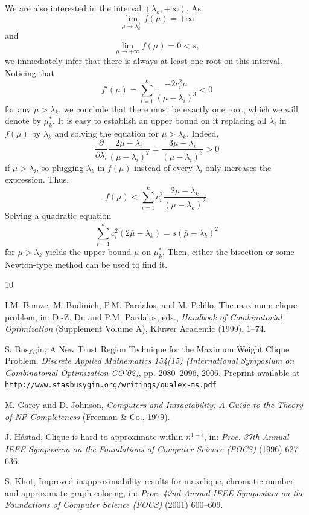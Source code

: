 \documentclass[11pt]{article}
\begin{document}
We are also interested in the interval $(\lambda_k, +\infty)$. As
\[ \lim_{\mu \to \lambda_k^+} f(\mu) = +\infty \]
and
\[ \lim_{\mu \to +\infty} f(\mu) = 0 < s, \]
we immediately infer that there is always at least one root on this interval.
Noticing that
\[ f'(\mu) = \sum_{i=1}^{k} \frac{-2 c_i^2 \mu}{(\mu - \lambda_i)^3} < 0 \]
for any $\mu>\lambda_k$, we conclude that there must be exactly one root, which
we will denote by $\mu_k^*$. It is easy to establish an upper bound on it
replacing all $\lambda_i$ in $f(\mu)$ by $\lambda_k$ and solving the equation
for $\mu>\lambda_k$. Indeed,
\[ \frac{\partial}{\partial \lambda_i} \frac{2 \mu - \lambda_i}{(\mu - \lambda_i)^2} = \frac{3 \mu - \lambda_i}{(\mu - \lambda_i)^3} > 0 \]
if $\mu>\lambda_i$, so plugging $\lambda_k$ in $f(\mu)$ instead of every
$\lambda_i$ only increases the expression. Thus,
\[ f(\mu) < \sum_{i=1}^k c_i^2 \frac{2 \mu - \lambda_k}{(\mu - \lambda_k)^2}. \]
Solving a quadratic equation
\[ \sum_{i=1}^k c_i^2 (2 \bar\mu - \lambda_k) = s (\bar\mu - \lambda_k)^2 \]
for $\bar\mu>\lambda_k$ yields the upper bound $\bar\mu$ on $\mu_k^*$. Then,
either the bisection or some Newton-type method can be used to find it.


\begin{thebibliography}{10}

  I.M. Bomze, M. Budinich, P.M. Pardalos, and M. Pelillo,
  The maximum clique problem,
  in: D.-Z. Du and P.M. Pardalos, eds.,
  {\em Handbook of Combinatorial Optimization\/} (Supplement Volume A),
  Kluwer Academic (1999), 1--74.

  S. Busygin,
  A New Trust Region Technique for the Maximum Weight Clique Problem,
  {\em Discrete Applied Mathematics 154(15) (International Symposium
  on Combinatorial Optimization CO'02)\/}, pp. 2080--2096, 2006.
  Preprint available at \verb|http://www.stasbusygin.org/writings/qualex-ms.pdf|

  M. Garey and D. Johnson,
  {\em Computers and Intractability: A Guide to the Theory of NP-Completeness\/}
  (Freeman \& Co., 1979).

  J. H\aa stad,
  Clique is hard to approximate within $n^{1-\epsilon}$,
  in: {\em Proc. 37th Annual IEEE Symposium on the Foundations of
  Computer Science (FOCS)\/} (1996) 627--636.

  S. Khot,
  Improved inapproximability results for maxclique, chromatic number and
  approximate graph coloring,
  in: {\em Proc. 42nd Annual IEEE Symposium on the Foundations of
  Computer Science (FOCS)\/} (2001) 600--609.

\end{thebibliography}
\end{document}
